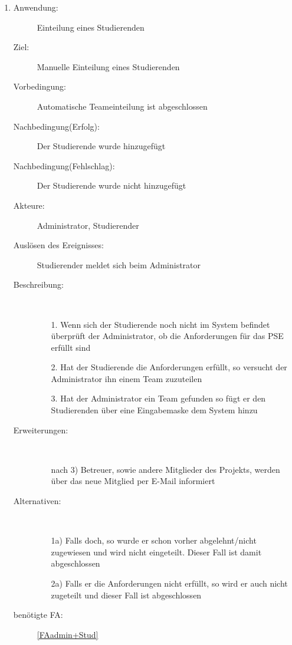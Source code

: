\documentclass[parskip=full]{scrartcl}
\newcommand{\swtLabel}[1]{\textbf{/#1\arabic*0/}}
\begin{document}
\begin{enumerate} [label=\swtLabel{A}]
  
  \item
  \begin{description}
  \item[Anwendung:] Einteilung eines Studierenden
  \item[Ziel:] Manuelle Einteilung eines Studierenden
  	\item[Vorbedingung:] Automatische Teameinteilung ist abgeschlossen
  	\item[Nachbedingung(Erfolg):] Der Studierende wurde hinzugefügt
  	\item[Nachbedingung(Fehlschlag):] Der Studierende wurde nicht hinzugefügt
  	\item[Akteure:] Administrator, Studierender
  	\item[Auslösen des Ereignisses:] Studierender meldet sich beim Administrator
  	\item[Beschreibung:]~
  	 \begin{enumerate} 
  	   \item[1.] Wenn sich der Studierende noch nicht im System befindet
  	   überprüft der Administrator, ob die Anforderungen für das \gls{PSE} erfüllt sind
  	   \item[2.] Hat der Studierende die Anforderungen erfüllt, so versucht der
  	   Administrator ihn einem Team zuzuteilen
  	   \item[3.] Hat der Administrator ein Team gefunden so fügt er den
  	   Studierenden über eine Eingabemaske dem System hinzu
  	 \end{enumerate}
  	\item[Erweiterungen:]~
  	 \begin{enumerate}
  	   \item [nach 3)] Betreuer, sowie andere Mitglieder des Projekts, werden
  	   über das neue Mitglied per E-Mail informiert 
  	 \end{enumerate}  
  	\item[Alternativen:] ~
  	 \begin{enumerate}
  	  \item[1a)] Falls doch, so wurde er schon vorher abgelehnt/nicht zugewiesen
  	  und wird nicht eingeteilt. Dieser Fall ist damit abgeschlossen
  	  \item [2a)] Falls er die Anforderungen nicht erfüllt, so wird er auch nicht
  	  zugeteilt und dieser Fall ist abgeschlossen
  	 \end{enumerate}  
  	 \item[benötigte FA:] \ref{FAadmin+Stud}
  \end{description}
   

\end{enumerate}
\end{document}
